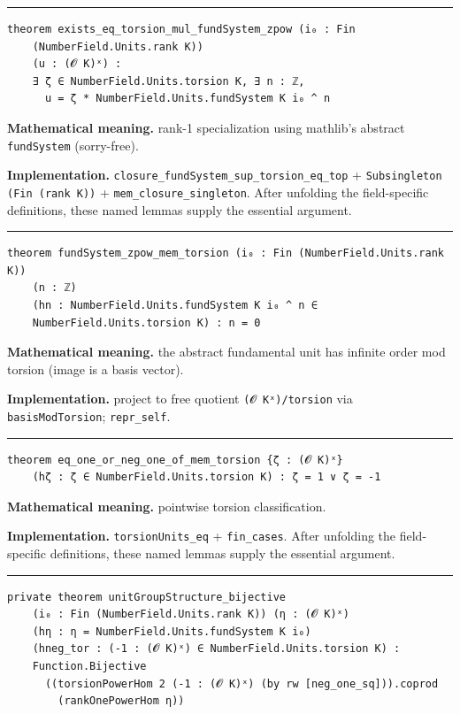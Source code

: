 \documentclass[UTF8,a4paper,11pt,fontset=fandol]{ctexart}
\theoremstyle{definition}
\newcommand{\statementsep}{\par\medskip\hrule\medskip}
\begin{document}
\statementsep
\begin{verbatim}
theorem exists_eq_torsion_mul_fundSystem_zpow (i₀ : Fin
    (NumberField.Units.rank K))
    (u : (𝓞 K)ˣ) :
    ∃ ζ ∈ NumberField.Units.torsion K, ∃ n : ℤ,
      u = ζ * NumberField.Units.fundSystem K i₀ ^ n
\end{verbatim}
\noindent\textbf{Mathematical meaning.} rank-1 specialization using mathlib's abstract \texttt{fundSystem} (sorry-free).\par
\noindent\textbf{Implementation.} \texttt{closure\_\allowbreak{}fundSystem\_\allowbreak{}sup\_\allowbreak{}torsion\_\allowbreak{}eq\_\allowbreak{}top} + \texttt{Subsingleton (Fin (rank K))} + \texttt{mem\_\allowbreak{}closure\_\allowbreak{}singleton}. After unfolding the field-specific definitions, these named lemmas supply the essential argument.\par
\statementsep
\begin{verbatim}
theorem fundSystem_zpow_mem_torsion (i₀ : Fin (NumberField.Units.rank K))
    (n : ℤ)
    (hn : NumberField.Units.fundSystem K i₀ ^ n ∈
    NumberField.Units.torsion K) : n = 0
\end{verbatim}
\noindent\textbf{Mathematical meaning.} the abstract fundamental unit has infinite order mod torsion (image is a basis vector).\par
\noindent\textbf{Implementation.} project to free quotient \texttt{(𝓞 Kˣ)/\allowbreak{}torsion} via \texttt{basisModTorsion}; \texttt{repr\_\allowbreak{}self}.\par
\statementsep
\begin{verbatim}
theorem eq_one_or_neg_one_of_mem_torsion {ζ : (𝓞 K)ˣ}
    (hζ : ζ ∈ NumberField.Units.torsion K) : ζ = 1 ∨ ζ = -1
\end{verbatim}
\noindent\textbf{Mathematical meaning.} pointwise torsion classification.\par
\noindent\textbf{Implementation.} \texttt{torsionUnits\_\allowbreak{}eq} + \texttt{fin\_\allowbreak{}cases}. After unfolding the field-specific definitions, these named lemmas supply the essential argument.\par
\statementsep
\begin{verbatim}
private theorem unitGroupStructure_bijective
    (i₀ : Fin (NumberField.Units.rank K)) (η : (𝓞 K)ˣ)
    (hη : η = NumberField.Units.fundSystem K i₀)
    (hneg_tor : (-1 : (𝓞 K)ˣ) ∈ NumberField.Units.torsion K) :
    Function.Bijective
      ((torsionPowerHom 2 (-1 : (𝓞 K)ˣ) (by rw [neg_one_sq])).coprod
        (rankOnePowerHom η))
\end{verbatim}
\end{document}
